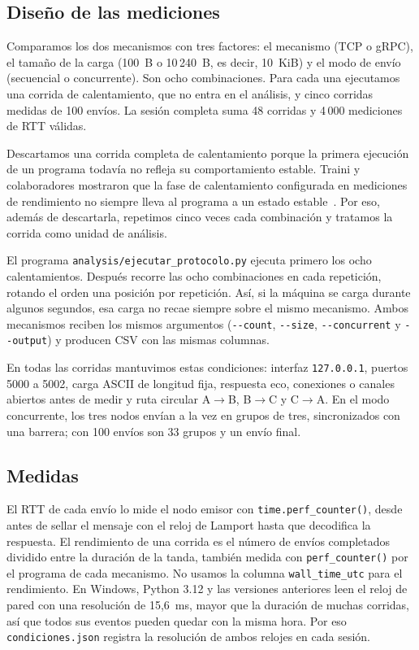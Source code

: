\subsection{Diseño de las mediciones}
\label{sec:protocolo}

Comparamos los dos mecanismos con tres factores: el mecanismo (TCP o gRPC), el tamaño de la carga (100~B o 10\,240~B, es decir, 10~KiB) y el modo de envío (secuencial o concurrente). Son ocho combinaciones. Para cada una ejecutamos una corrida de calentamiento, que no entra en el análisis, y cinco corridas medidas de 100 envíos. La sesión completa suma 48 corridas y 4\,000 mediciones de RTT válidas.

Descartamos una corrida completa de calentamiento porque la primera ejecución de un programa todavía no refleja su comportamiento estable. Traini y colaboradores mostraron que la fase de calentamiento configurada en mediciones de rendimiento no siempre lleva al programa a un estado estable~\cite{traini2023steady}. Por eso, además de descartarla, repetimos cinco veces cada combinación y tratamos la corrida como unidad de análisis.

El programa \texttt{analysis/ejecutar\_protocolo.py} ejecuta primero los ocho calentamientos. Después recorre las ocho combinaciones en cada repetición, rotando el orden una posición por repetición. Así, si la máquina se carga durante algunos segundos, esa carga no recae siempre sobre el mismo mecanismo. Ambos mecanismos reciben los mismos argumentos (\texttt{-{}-count}, \texttt{-{}-size}, \texttt{-{}-concurrent} y \texttt{-{}-output}) y producen CSV con las mismas columnas.

En todas las corridas mantuvimos estas condiciones: interfaz \texttt{127.0.0.1}, puertos 5000 a 5002, carga ASCII de longitud fija, respuesta eco, conexiones o canales abiertos antes de medir y ruta circular A$\to$B, B$\to$C y C$\to$A. En el modo concurrente, los tres nodos envían a la vez en grupos de tres, sincronizados con una barrera; con 100 envíos son 33 grupos y un envío final.

\subsection{Medidas}

El RTT de cada envío lo mide el nodo emisor con \texttt{time.perf\_counter()}, desde antes de sellar el mensaje con el reloj de Lamport hasta que decodifica la respuesta. El rendimiento de una corrida es el número de envíos completados dividido entre la duración de la tanda, también medida con \texttt{perf\_counter()} por el programa de cada mecanismo. No usamos la columna \texttt{wall\_time\_utc} para el rendimiento. En Windows, Python 3.12 y las versiones anteriores leen el reloj de pared con una resolución de 15,6~ms, mayor que la duración de muchas corridas, así que todos sus eventos pueden quedar con la misma hora. Por eso \texttt{condiciones.json} registra la resolución de ambos relojes en cada sesión.

